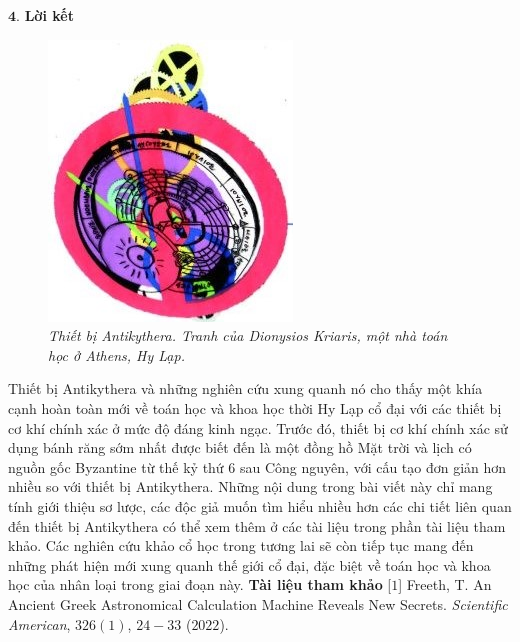 \begin{multicols}{2}
	\vskip 0.1cm
	$\pmb{4.}$ \textbf{\color{lichsutoanhoc}Lời kết}
	\begin{figure}[H]
		\vspace*{-10pt}
		\centering
		\captionsetup{labelformat= empty, justification=centering}
		\includegraphics[width= 0.75\linewidth]{12}
		\caption{\small\textit{\color{lichsutoanhoc}Thiết bị Antikythera. Tranh của Dionysios Kriaris, một nhà toán học ở Athens, Hy Lạp.}}
		\vspace*{-10pt}
	\end{figure}
	Thiết bị Antikythera và những nghiên cứu xung quanh nó cho thấy một khía cạnh hoàn toàn mới về toán học và khoa học thời Hy Lạp cổ đại với các thiết bị cơ khí chính xác ở mức độ đáng kinh ngạc. Trước đó, thiết bị cơ khí chính xác sử dụng bánh răng sớm nhất được biết đến là một đồng hồ Mặt trời và lịch có nguồn gốc Byzantine từ thế kỷ thứ $6$ sau Công nguyên, với cấu tạo đơn giản hơn nhiều so với thiết bị Antikythera. Những nội dung trong bài viết này chỉ mang tính giới thiệu sơ lược, các độc giả muốn tìm hiểu nhiều hơn các chi tiết liên quan đến thiết bị Antikythera có thể xem thêm ở các tài liệu trong phần tài liệu tham khảo. Các nghiên cứu khảo cổ học trong tương lai sẽ còn tiếp tục mang đến những phát hiện mới xung quanh thế giới cổ đại, đặc biệt về toán học và khoa học của nhân loại trong giai đoạn này.
	\vskip 0.1cm
	\textbf{\color{lichsutoanhoc}Tài liệu tham khảo}
	\vskip 0.1cm
	[$1$] Freeth, T. An Ancient Greek Astronomical Calculation Machine Reveals New Secrets. \textit{Scientific American}, $326(1)$, $24-33$ ($2022$).

\end{multicols}
